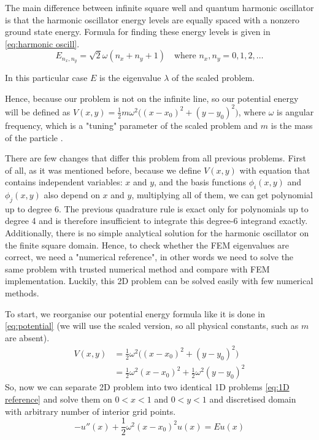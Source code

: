 \documentclass[conference]{IEEEtran}
\begin{document}
The main difference between infinite square well and quantum harmonic oscillator is that the harmonic oscillator energy levels  are equally spaced with a nonzero ground state energy. Formula for finding these energy levels is given in \ref{eq:harmonic oscill}.
\begin{equation}
    E_{n_x, n_y} = \sqrt{2}\omega(n_x + n_y + 1) \quad \text{where } n_x, n_y = 0, 1, 2, \dots
    \label{eq:harmonic oscill}
\end{equation}

In this particular case $E$ is the eigenvalue $\lambda$ of the scaled problem.

Hence, because our problem is not on the infinite line, so our potential energy will be defined as $V(x, y) = \frac{1}{2}m\omega^2\Big((x - x_0)^2 + (y - y_0)^2\Big)$, where $\omega$ is angular frequency, which is a "tuning" parameter of the scaled problem and $m$ is the mass of the particle \cite{b28}.

There are few changes that differ this problem from all previous problems. First of all, as it was mentioned before, because we define $V(x, y)$ with equation that contains independent variables: $x$ and $y$, and the basis functions $\phi_i(x, y)$ and $\phi_j(x, y)$ also depend on $x$ and $y$, multiplying all of them, we can get polynomial up to degree 6. The previous quadrature rule is exact only for polynomials up to degree 4 and is therefore insufficient to integrate this degree-6 integrand exactly.
Additionally, there is no simple analytical solution for the harmonic oscillator on the finite square domain. Hence, to check whether the FEM eigenvalues are correct, we need a "numerical reference", in other words we need to solve the same problem with trusted numerical method and compare with FEM implementation. Luckily, this 2D problem can be solved easily with few numerical methods.

To start, we reorganise our potential energy formula like it is done in \ref{eq:potential} (we will use the scaled version, so all physical constants, such as $m$ are absent).
\begin{equation}
\begin{aligned}
    V(x, y) &= \frac{1}{2} \omega^2\Big((x - x_0)^2 + (y - y_0)^2\Big) \\
    &= \frac{1}{2}\omega^2(x - x_0)^2 + \frac{1}{2}\omega^2(y - y_0)^2
    \label{eq:potential}
\end{aligned}
\end{equation}
So, now we can separate 2D problem into two identical 1D problems \ref{eq:1D reference} and solve them on $0 < x < 1$ and $0 < y < 1$ and discretised domain with arbitrary number of interior grid points.
\begin{equation}
    -u''(x) + \frac{1}{2}\omega^2(x - x_0)^2u(x) = Eu(x)
    \label{eq:1D reference}
\end{equation}
\end{document}

